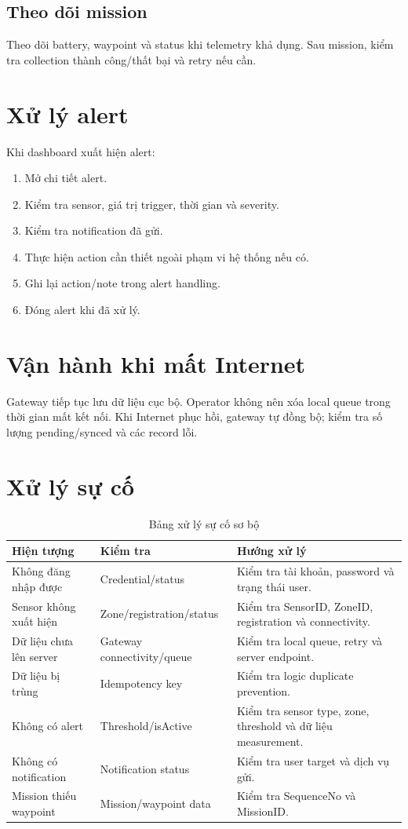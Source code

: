\subsection{Theo dõi mission}
Theo dõi battery, waypoint và status khi telemetry khả dụng. Sau mission, kiểm tra collection thành công/thất bại và retry nếu cần.

\section{Xử lý alert}
Khi dashboard xuất hiện alert:
\begin{enumerate}
  \item Mở chi tiết alert.
  \item Kiểm tra sensor, giá trị trigger, thời gian và severity.
  \item Kiểm tra notification đã gửi.
  \item Thực hiện action cần thiết ngoài phạm vi hệ thống nếu có.
  \item Ghi lại action/note trong alert handling.
  \item Đóng alert khi đã xử lý.
\end{enumerate}

\section{Vận hành khi mất Internet}
Gateway tiếp tục lưu dữ liệu cục bộ. Operator không nên xóa local queue trong thời gian mất kết nối. Khi Internet phục hồi, gateway tự đồng bộ; kiểm tra số lượng pending/synced và các record lỗi.

\section{Xử lý sự cố}
\begin{longtable}{p{4cm}p{4.5cm}p{4.5cm}}
\caption{Bảng xử lý sự cố sơ bộ}\label{tab:trouble}\\
\toprule
Hiện tượng & Kiểm tra & Hướng xử lý \\
\midrule
Không đăng nhập được & Credential/status & Kiểm tra tài khoản, password và trạng thái user.\\
Sensor không xuất hiện & Zone/registration/status & Kiểm tra SensorID, ZoneID, registration và connectivity.\\
Dữ liệu chưa lên server & Gateway connectivity/queue & Kiểm tra local queue, retry và server endpoint.\\
Dữ liệu bị trùng & Idempotency key & Kiểm tra logic duplicate prevention.\\
Không có alert & Threshold/isActive & Kiểm tra sensor type, zone, threshold và dữ liệu measurement.\\
Không có notification & Notification status & Kiểm tra user target và dịch vụ gửi.\\
Mission thiếu waypoint & Mission/waypoint data & Kiểm tra SequenceNo và MissionID.\\
\bottomrule
\end{longtable}
